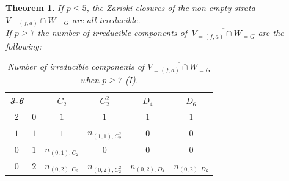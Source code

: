 \documentclass{amsart}
\numberwithin{equation}{section}
\newtheorem{theorem}{Theorem}[section]  %
\theoremstyle{definition}
\theoremstyle{remark}
\begin{document}
\begin{theorem} \label{irreducible_components_theorem}
If $p\leq5$, the Zariski closures of the non-empty strata $V_{=(f,a)}\cap W_{= G}$ are all irreducible.\\

If $p\geq 7$ the number of irreducible components of $\,\overline{V_{=(f,a)}\cap W_{= G}}$ are the following:\\
\begin{table}[H]
\centering
\begin{tabular}{cc|c|c|c|c|}
\cline{3-6}
                                                &                           & \cellcolor[HTML]{a7c957}$C_2$ & \cellcolor[HTML]{a7c957}$C_2^2$ & \cellcolor[HTML]{a7c957}$D_4$ & \cellcolor[HTML]{a7c957}$D_6$ \\ \hline
\multicolumn{1}{|c|}{\cellcolor[HTML]{a7c957}$2$} & \cellcolor[HTML]{a7c957}$0$ & $1$ & $1$ & $1$ & $1$ \\ \hline
\multicolumn{1}{|c|}{\cellcolor[HTML]{a7c957}$1$} & \cellcolor[HTML]{a7c957}$1$ & $1$ & $n_{(1,1),C_2^2}$ & {\color[HTML]{C0C0C0} $0$} & {\color[HTML]{C0C0C0} $0$} \\ \hline
\multicolumn{1}{|c|}{\cellcolor[HTML]{a7c957}$0$} & \cellcolor[HTML]{a7c957}$1$ & $n_{(0,1),C_2}$ & {\color[HTML]{C0C0C0} $0$} & {\color[HTML]{C0C0C0} $0$} & {\color[HTML]{C0C0C0} $0$} \\ \hline
\multicolumn{1}{|c|}{\cellcolor[HTML]{a7c957}$0$} & \cellcolor[HTML]{a7c957}$2$ & $n_{(0,2),C_2}$ & $n_{(0,2),C_2^2}$ & $n_{(0,2),D_4}$ & $n_{(0,2),D_6}$ \\ \hline
\end{tabular}
\caption{Number of irreducible components of $\overline{V_{=(f,a)}\cap W_{= G}}$ when $p\geq7$ (I).}
\label{tableI}
\end{table}


\end{theorem}
\end{document}
